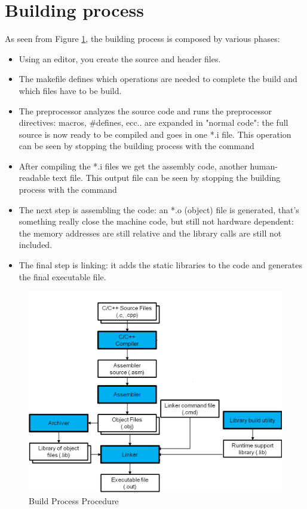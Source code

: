 
\section{Building process}
As seen from Figure \ref{Fig:Build_process}, the building process is composed by various phases:
\begin{itemize}
	\item Using an editor, you create the source and header files.
	\item The makefile defines which operations are needed to complete the build and which files have to be build.
	\item The preprocessor analyzes the source code and runs the preprocessor directives: macros, \#defines, ecc.. are expanded in "normal code": the full source is now ready to be compiled and goes in one *.i file. This operation can be seen by stopping the building process with the command 
	\item After compiling the *.i files we get the assembly code, another human-readable text file. This output file can be seen by stopping the building process with the command 
	\item The next step is assembling the code: an *.o (object) file is generated, that's something really close the machine code, but still not hardware dependent: the memory addresses are still relative and the library calls are still not included.
	\item The final step is linking: it adds the static libraries to the code and generates the final executable file.
\end{itemize}
\begin{figure}[h]
	\centering
	\includegraphics[width=\textwidth]{gfx/build_process}
	
	\caption{Build Process Procedure}
	\label{Fig:Build_process}
\end{figure}

